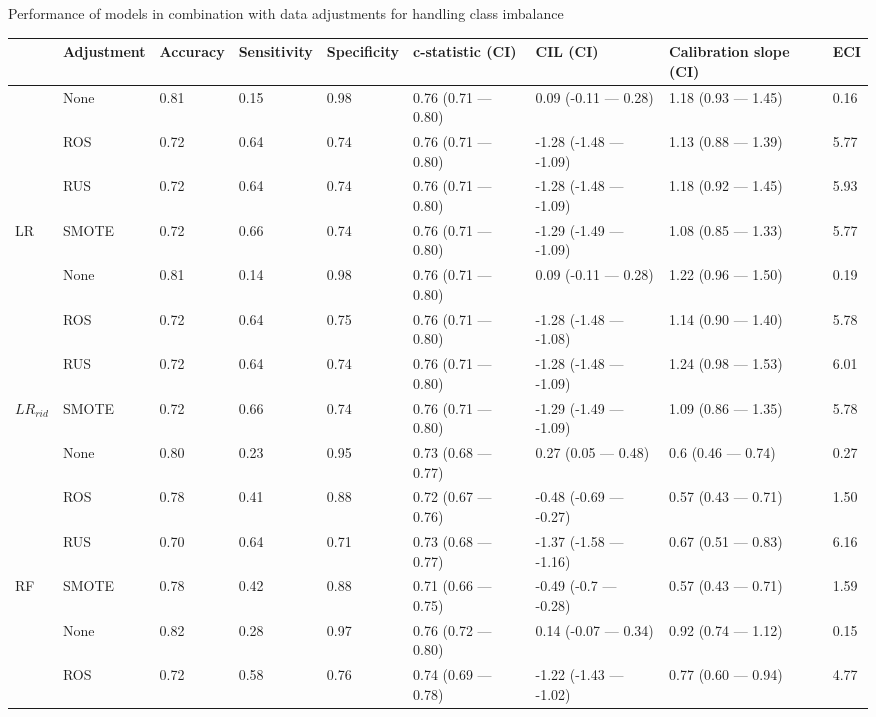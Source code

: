 \documentclass[AMA,STIX1COL, table]{WileyNJD-v2}
\begin{document}
\begin{landscape}

\begin{threeparttable}

\centering
\caption{Performance of models in combination with data adjustments for handling class imbalance\label{tab2}}%
\begin{tabular}{lllllllll}
  \toprule
 & Adjustment & Accuracy & Sensitivity & Specificity & c-statistic (CI) & CIL (CI) & Calibration slope (CI) & ECI \\ 
  \midrule
&None & 0.81 & 0.15 & 0.98 & 0.76 (0.71 — 0.80) & 0.09 (-0.11 — 0.28) &1.18 (0.93 — 1.45) & 0.16 \\ 
  &ROS & 0.72 & 0.64 & 0.74 & 0.76 (0.71 — 0.80) & -1.28 (-1.48 — -1.09) & 1.13 (0.88 — 1.39) & 5.77 \\ 
  &RUS & 0.72 & 0.64 & 0.74 & 0.76 (0.71 — 0.80) & -1.28 (-1.48 — -1.09) & 1.18 (0.92 — 1.45) & 5.93 \\ 
  \multirow{-2}{4em}{LR}&SMOTE & 0.72 & 0.66 & 0.74 & 0.76 (0.71 — 0.80) & -1.29 (-1.49 — -1.09) & 1.08 (0.85 — 1.33) & 5.77 \\ 
  \midrule
  &None & 0.81 & 0.14 & 0.98 & 0.76 (0.71 — 0.80) & 0.09 (-0.11 — 0.28) & 1.22 (0.96 — 1.50) & 0.19 \\ 
  &ROS & 0.72 & 0.64 & 0.75 & 0.76 (0.71 — 0.80) & -1.28 (-1.48 — -1.08) & 1.14 (0.90 — 1.40) & 5.78 \\ 
  &RUS & 0.72 & 0.64 & 0.74 & 0.76 (0.71 — 0.80) & -1.28 (-1.48 — -1.09) & 1.24 (0.98 — 1.53) & 6.01 \\ 
  \multirow{-2}{4em}{$LR_{rid}$}&SMOTE & 0.72 & 0.66 & 0.74 & 0.76 (0.71 — 0.80) & -1.29 (-1.49 — -1.09) & 1.09 (0.86 — 1.35) & 5.78 \\ 
  \midrule
  &None & 0.80 & 0.23 & 0.95 & 0.73 (0.68 — 0.77) & 0.27 (0.05 — 0.48) & 0.6 (0.46 — 0.74) & 0.27 \\ 
  &ROS & 0.78 & 0.41 & 0.88 & 0.72 (0.67 — 0.76) & -0.48 (-0.69 — -0.27) & 0.57 (0.43 — 0.71) & 1.50 \\ 
  &RUS & 0.70 & 0.64 & 0.71 & 0.73 (0.68 — 0.77) & -1.37 (-1.58 — -1.16) & 0.67 (0.51 — 0.83) & 6.16 \\ 
  \multirow{-2}{4em}{RF}&SMOTE & 0.78 & 0.42 & 0.88 & 0.71 (0.66 — 0.75) & -0.49 (-0.7 — -0.28) & 0.57 (0.43 — 0.71) & 1.59 \\ 
  \midrule
  &None & 0.82 & 0.28 & 0.97 & 0.76 (0.72 — 0.80) & 0.14 (-0.07 — 0.34) & 0.92 (0.74 — 1.12) & 0.15 \\ 
  &ROS & 0.72 & 0.58 & 0.76 & 0.74 (0.69 — 0.78) & -1.22 (-1.43 — -1.02) & 0.77 (0.60 — 0.94) & 4.77 \\ 

\end{tabular}
\end{threeparttable}
\end{landscape}
\end{document}
